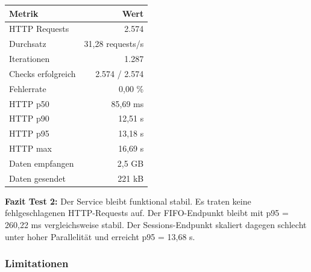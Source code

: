 \begin{table}[h]
\centering
\begin{tabular}{|l|r|}
\hline
\textbf{Metrik} & \textbf{Wert} \\
\hline
HTTP Requests & 2.574 \\
\hline
Durchsatz & 31,28 requests/s \\
\hline
Iterationen & 1.287 \\
\hline
Checks erfolgreich & 2.574 / 2.574 \\
\hline
Fehlerrate & 0,00 \% \\
\hline
HTTP p50 & 85,69 ms \\
\hline
HTTP p90 & 12,51 s \\
\hline
HTTP p95 & 13,18 s \\
\hline
HTTP max & 16,69 s \\
\hline
Daten empfangen & 2,5 GB \\
\hline
Daten gesendet & 221 kB \\
\hline
\end{tabular}
\end{table}

\textbf{Fazit Test 2:}
Der Service bleibt funktional stabil. Es traten keine fehlgeschlagenen HTTP-Requests auf. Der FIFO-Endpunkt bleibt mit p95 = 260,22 ms vergleichsweise stabil. Der Sessions-Endpunkt skaliert dagegen schlecht unter hoher Parallelität und erreicht p95 = 13,68 s. 


\subsubsection{Limitationen}

